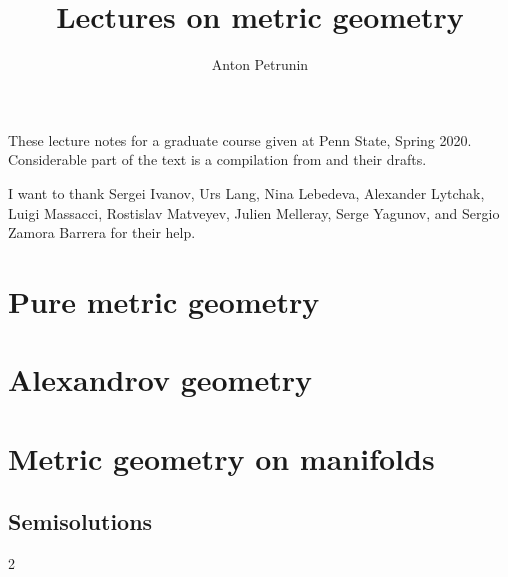 \documentclass[twoside]{book}
\begin{document}
 
\title{Lectures on metric geometry}
\author{Anton Petrunin}
\date{}
\maketitle

These lecture notes for a graduate course given at Penn State, Spring 2020.
Considerable part of the text is a compilation from \cite{alexander-kapovitch-petrunin-2019, alexander-kapovitch-petrunin-2025, petrunin-yashinski, petrunin-2022-PIGTIKAL, petrunin-zamorabarrera} and their drafts.

I want to thank 
Sergei Ivanov,
Urs Lang,
Nina Lebedeva,
Alexander Lytchak,
Luigi Massacci,
Rostislav Matveyev,
Julien Melleray,
Serge Yagunov,
and Sergio Zamora Barrera for their help.

\thispagestyle{empty}
\cleardoublepage
{}
{}
\tableofcontents
\thispagestyle{empty}

%
\part{Pure metric geometry}




%


\part{Alexandrov geometry}







\part{Metric geometry on manifolds}


%
%
%

\backmatter

\chapter{Semisolutions}

{

\footnotesize
\begin{multicols}{2}







\end{multicols}
}

%
{\small\sloppy


\def\emph{\textit}

\printbibliography[heading=bibintoc]
\fussy
}
\end{document}
